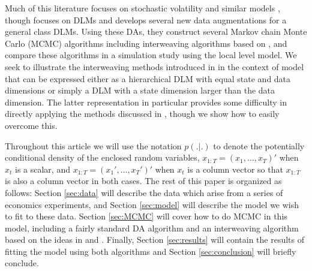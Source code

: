 \documentclass[graybox]{svmult}
\begin{document}
Much of this literature focuses on stochastic volatility and similar models \citep{shephard1996statistical,fruhwirth2003bayesian,roberts2004bayesian,bos2006inference,strickland2008parameterisation,fruhwirth2008heston,kastner2013ancillarity}, though \cite{simpson2014interweaving} focuses on DLMs and develops several new data augmentations for a general class DLMs. Using these DAs, they construct several Markov chain Monte Carlo (MCMC)  algorithms including interweaving algorithms based on \cite{yu2011center}, and compare these algorithms in a simulation study using the local level model. We seek to illustrate the interweaving methods introduced in \cite{simpson2014interweaving} in the context of model that can be expressed either as a hierarchical DLM with equal state and data dimensions or simply a DLM with a state dimension larger than the data dimension. The latter representation in particular provides some difficulty in directly applying the methods discussed in \cite{simpson2014interweaving}, though we show how to easily overcome this.

Throughout this article we will use the notation $p(.|.)$ to denote the potentially conditional density of the enclosed random variables, $x_{1:T}=(x_1,\dots,x_T)'$ when $x_t$ is a scalar, and $x_{1:T}=(x_1',\dots,x_T')'$ when $x_t$ is a column vector so that $x_{1:T}$ is also a column vector in both cases. The rest of this paper is organized as follows: Section \ref{sec:data} will describe the data which arise from a series of economics experiments, and Section \ref{sec:model} will describe the model we wish to fit to these data. Section \ref{sec:MCMC} will cover how to do MCMC in this model, including a fairly standard DA algorithm and an interweaving algorithm based on the ideas in \cite{simpson2014interweaving} and \cite{yu2011center}. Finally, Section \ref{sec:results} will contain the results of fitting the model using both algorithms and Section \ref{sec:conclusion} will briefly conclude.
\end{document}
